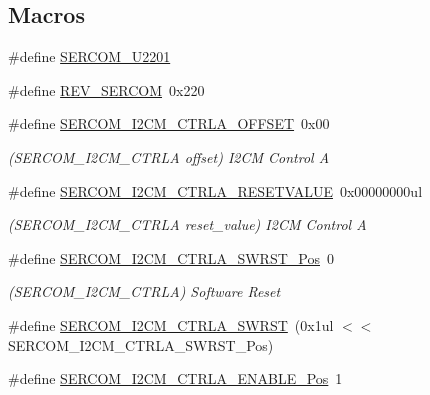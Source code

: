 \subsection*{Macros}
\begin{DoxyCompactItemize}
\item 
\#define \mbox{\hyperlink{group___s_a_m_d21___s_e_r_c_o_m_gae9efb26eaf850e0125bb89b1c0e072dc}{S\+E\+R\+C\+O\+M\+\_\+\+U2201}}
\item 
\#define \mbox{\hyperlink{group___s_a_m_d21___s_e_r_c_o_m_ga95bc71ffa6449bc7e3c9a4bab1eecfe3}{R\+E\+V\+\_\+\+S\+E\+R\+C\+OM}}~0x220
\item 
\#define \mbox{\hyperlink{group___s_a_m_d21___s_e_r_c_o_m_gaf2ddd5fe6e8a96fab454c5c133f81044}{S\+E\+R\+C\+O\+M\+\_\+\+I2\+C\+M\+\_\+\+C\+T\+R\+L\+A\+\_\+\+O\+F\+F\+S\+ET}}~0x00
\begin{DoxyCompactList}\small\item\em (S\+E\+R\+C\+O\+M\+\_\+\+I2\+C\+M\+\_\+\+C\+T\+R\+LA offset) I2\+CM Control A \end{DoxyCompactList}\item 
\#define \mbox{\hyperlink{group___s_a_m_d21___s_e_r_c_o_m_gac9b8ab7883578c82daa4f8113f1078c9}{S\+E\+R\+C\+O\+M\+\_\+\+I2\+C\+M\+\_\+\+C\+T\+R\+L\+A\+\_\+\+R\+E\+S\+E\+T\+V\+A\+L\+UE}}~0x00000000ul
\begin{DoxyCompactList}\small\item\em (S\+E\+R\+C\+O\+M\+\_\+\+I2\+C\+M\+\_\+\+C\+T\+R\+LA reset\+\_\+value) I2\+CM Control A \end{DoxyCompactList}\item 
\#define \mbox{\hyperlink{group___s_a_m_d21___s_e_r_c_o_m_ga32388e778d6020a6fe2fbb8d2d0a6221}{S\+E\+R\+C\+O\+M\+\_\+\+I2\+C\+M\+\_\+\+C\+T\+R\+L\+A\+\_\+\+S\+W\+R\+S\+T\+\_\+\+Pos}}~0
\begin{DoxyCompactList}\small\item\em (S\+E\+R\+C\+O\+M\+\_\+\+I2\+C\+M\+\_\+\+C\+T\+R\+LA) Software Reset \end{DoxyCompactList}\item 
\#define \mbox{\hyperlink{group___s_a_m_d21___s_e_r_c_o_m_ga0e7f4d6cf8173caf7ada8cbb699f01c1}{S\+E\+R\+C\+O\+M\+\_\+\+I2\+C\+M\+\_\+\+C\+T\+R\+L\+A\+\_\+\+S\+W\+R\+ST}}~(0x1ul $<$$<$ S\+E\+R\+C\+O\+M\+\_\+\+I2\+C\+M\+\_\+\+C\+T\+R\+L\+A\+\_\+\+S\+W\+R\+S\+T\+\_\+\+Pos)
\item 
\#define \mbox{\hyperlink{group___s_a_m_d21___s_e_r_c_o_m_ga77940e272336b631b01356a9e315a17d}{S\+E\+R\+C\+O\+M\+\_\+\+I2\+C\+M\+\_\+\+C\+T\+R\+L\+A\+\_\+\+E\+N\+A\+B\+L\+E\+\_\+\+Pos}}~1
$$
\end{DoxyCompactItemize}
